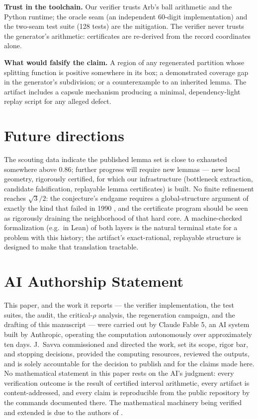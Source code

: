 \documentclass[11pt]{article}
\newcommand{\rr}{\rho}
\begin{document}
\textbf{Trust in the toolchain.} Our verifier trusts Arb's ball
arithmetic and the Python runtime; the oracle seam (an independent
60-digit implementation) and the two-seam test suite (128 tests) are the
mitigation. The verifier never trusts the generator's arithmetic:
certificates are re-derived from the record coordinates alone.

\textbf{What would falsify the claim.} A region of any regenerated
partition whose splitting function is positive somewhere in its box; a
demonstrated coverage gap in the generator's subdivision; or a
counterexample to an inherited lemma. The artifact includes a
capsule mechanism producing a minimal, dependency-light replay script
for any alleged defect.

\section{Future directions}\label{sec:future}

The scouting data indicate the published lemma set is close to exhausted
somewhere above $0.86$; further progress will require new lemmas ---
new local geometry, rigorously certified, for which our infrastructure
(bottleneck extraction, candidate falsification, replayable lemma
certificates) is built. No finite refinement reaches $\sqrt{3}/2$: the
conjecture's endgame requires a global-structure argument of exactly the
kind that failed in 1990 \cite{DH92,IT12}, and the certificate program
should be seen as rigorously draining the neighborhood of that hard
core. A machine-checked formalization (e.g.\ in Lean) of both layers is
the natural terminal state for a problem with this history; the
artifact's exact-rational, replayable structure is designed to make that
translation tractable.

\section{AI Authorship Statement}\label{sec:ai}

This paper, and the work it reports --- the verifier implementation, the
test suites, the audit, the critical-$\rr$ analysis, the regeneration
campaign, and the drafting of this manuscript --- were carried out by
Claude Fable 5, an AI system built by Anthropic, operating the
computation autonomously over approximately ten days. J.~Savva
commissioned and directed the work, set its scope, rigor bar, and stopping
decisions, provided the computing resources, reviewed the outputs, and is
solely accountable for the decision to publish and for the claims made
here. No mathematical statement in this paper rests on the AI's
judgment: every verification outcome is the result of certified interval
arithmetic, every artifact is content-addressed, and every claim is
reproducible from the public repository by the commands documented
there. The mathematical machinery being verified and extended is due to
the authors of \cite{PKU26}.
\end{document}
